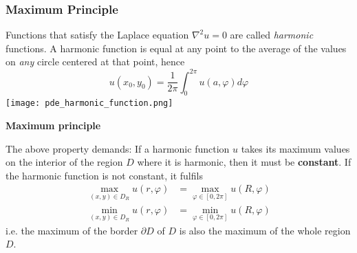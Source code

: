 \subsubsection{Maximum Principle}
Functions that satisfy the Laplace equation $\nabla^2 u=0$ are called \textit{harmonic} functions. A harmonic function is equal at any point to the average of the values on \textit{any} circle centered at that point, hence
\begin{equation*}
    u(x_0, y_0)=\frac{1}{2\pi}\int_{0}^{2\pi}u(a,\varphi)d\varphi
\end{equation*}
\texttt{[image: pde\_harmonic\_function.png]}

\textbf{Maximum principle}

The above property demands: If a harmonic function $u$ takes its maximum values on the interior of the region $D$ where it is harmonic, then it must be \textbf{constant}.
If the harmonic function is not constant, it fulfils
\begin{align*}
    \max_{(x,y)\in D_R} u(r,\varphi) & = \max_{\varphi\in[0,2\pi]} u(R,\varphi) \\
    \min_{(x,y)\in D_R} u(r,\varphi) & = \min_{\varphi\in[0,2\pi]} u(R,\varphi)
\end{align*}
i.e. the maximum of the border $\partial D$ of $D$ is also the maximum of the whole region $D$.

